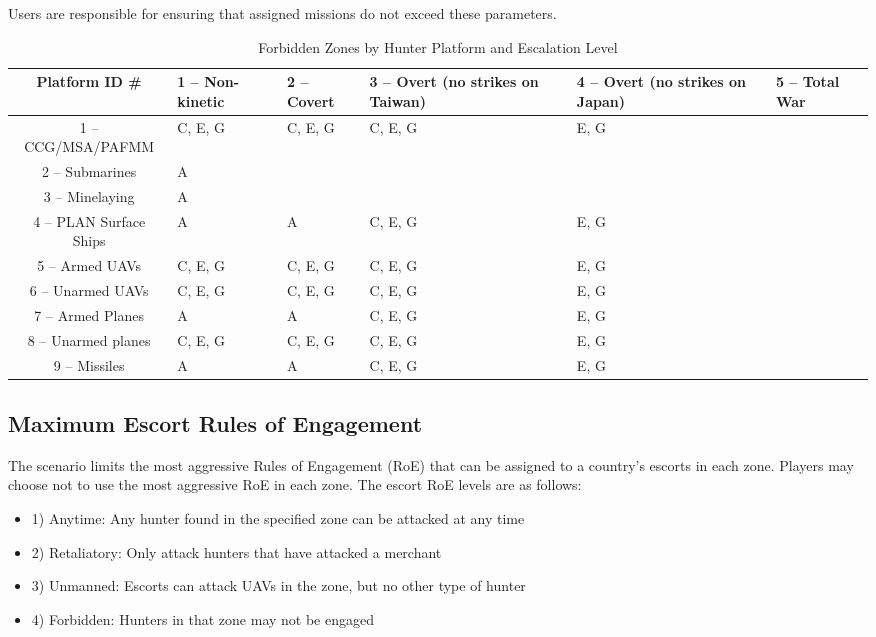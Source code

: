 \documentclass{article}
\begin{document}
Users are responsible for ensuring that assigned missions do not exceed these parameters.

\begin{table}[H]
\centering
\begin{tabularx}{\textwidth}{|c|X|X|X|X|X|}
\hline
\textbf{Platform ID \#} & \textbf{1 -- Non-kinetic} & \textbf{2 -- Covert} & \textbf{3 -- Overt (no strikes on Taiwan)} & \textbf{4 -- Overt (no strikes on Japan)} & \textbf{5 -- Total War} \\ 
\hline
1 -- CCG/MSA/PAFMM & C, E, G & C, E, G & C, E, G & E, G & \\ 
\hline
2 -- Submarines & A & & & & \\ 
\hline
3 -- Minelaying & A & & & & \\ 
\hline
4 -- PLAN Surface Ships & A & A & C, E, G & E, G & \\ 
\hline
5 -- Armed UAVs & C, E, G & C, E, G & C, E, G & E, G & \\ 
\hline
6 -- Unarmed UAVs & C, E, G & C, E, G & C, E, G & E, G & \\ 
\hline
7 -- Armed Planes & A & A & C, E, G & E, G & \\ 
\hline
8 -- Unarmed planes & C, E, G & C, E, G & C, E, G & E, G & \\ 
\hline
9 -- Missiles & A & A & C, E, G & E, G & \\ 
\hline
\end{tabularx}
\caption{Forbidden Zones by Hunter Platform and Escalation Level}
\end{table}

\subsection*{Maximum Escort Rules of Engagement}

The scenario limits the most aggressive Rules of Engagement (RoE) that can be assigned to a country’s escorts in each zone. Players may choose not to use the most aggressive RoE in each zone. The escort RoE levels are as follows:
\begin{itemize}
    \item 1) Anytime: Any hunter found in the specified zone can be attacked at any time
    \item 2) Retaliatory: Only attack hunters that have attacked a merchant
    \item 3) Unmanned: Escorts can attack UAVs in the zone, but no other type of hunter
    \item 4) Forbidden: Hunters in that zone may not be engaged
\end{itemize}
\end{document}
